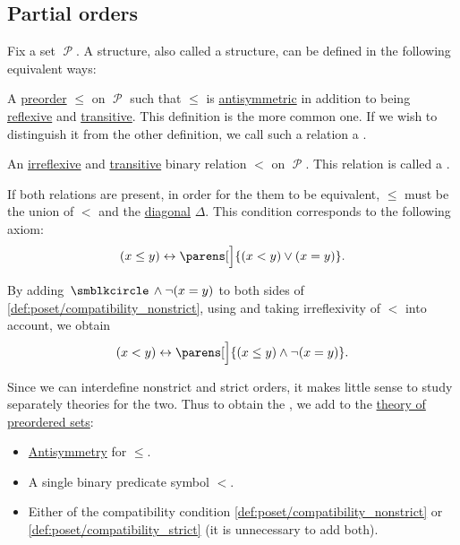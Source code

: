 \subsection{Partial orders}\label{subsec:partial_orders}

\begin{definition}\label{def:poset}
  Fix a set \( \mscrP \). A  structure, also called a  structure, can be defined in the following equivalent ways:
  \begin{thmenum}[series=def:poset]
     A \hyperref[def:preordered_set]{preorder} \( \leq \) on \( \mscrP \) such that \( \leq \) is \hyperref[def:binary_relation/antisymmetric]{antisymmetric} in addition to being \hyperref[def:binary_relation/reflexive]{reflexive} and \hyperref[def:binary_relation/transitive]{transitive}. This definition is the more common one. If we wish to distinguish it from the other definition, we call such a relation a .

     An \hyperref[def:binary_relation/irreflexive]{irreflexive} and \hyperref[def:binary_relation/transitive]{transitive} binary relation \( < \) on \( \mscrP \). This relation is called a .
  \end{thmenum}

  If both relations are present, in order for the them to be equivalent, \( \leq \) must be the union of \( < \) and the \hyperref[def:binary_relation/diagonal]{diagonal} \( \Delta \). This condition corresponds to the following axiom:
  \begin{equation}\label{def:poset/compatibility_nonstrict}
    (x \leq y) \leftrightarrow \parens[\Big]{(x < y) \vee (x = y)}.
  \end{equation}

  By adding \( \placeholder \wedge \neg (x = y) \) to both sides of \eqref{def:poset/compatibility_nonstrict}, using  and taking irreflexivity of \( < \) into account, we obtain
  \begin{equation}\label{def:poset/compatibility_strict}
    (x < y) \leftrightarrow \parens[\Big]{(x \leq y) \wedge \neg (x = y)}.
  \end{equation}

  \begin{thmenum}[resume=def:poset]
     Since we can interdefine nonstrict and strict orders, it makes little sense to study separately theories for the two. Thus to obtain the , we add to the \hyperref[def:preordered_set/theory]{theory of preordered sets}:
    \begin{itemize}
      \item \hyperref[def:binary_relation/antisymmetric]{Antisymmetry} for \( \leq \).
      \item A single binary predicate symbol \( < \).
      \item Either of the compatibility condition \eqref{def:poset/compatibility_nonstrict} or \eqref{def:poset/compatibility_strict} (it is unnecessary to add both).
    \end{itemize}


\end{thmenum}
\end{definition}
